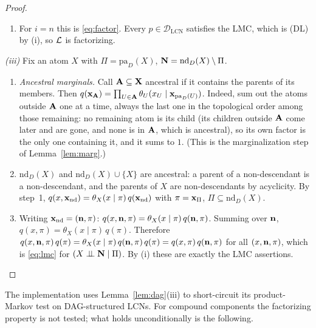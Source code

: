 \documentclass{article} %
\newcommand{\indep}{\perp\!\!\!\perp}
\newcommand{\DLCN}{\mathcal{D}_{\mathrm{LCN}}}
\newcommand{\pa}{\mathrm{pa}}
\begin{document}
\begin{proof}
\begin{enumerate}
  $p(x_1,\dots,x_i)=\theta_{X_i}(x_i\mid\pi)\,p(x_1,\dots,x_{i-1})$, and the
  induction hypothesis concludes.
  \item For $i=n$ this is \eqref{eq:factor}. Every $p\in\DLCN$ satisfies the LMC,
  which is (DL) by (i), so $\mathcal{L}$ is factorizing.
\end{enumerate}
\emph{(iii)} Fix an atom $X$ with $\Pi=\pa_D(X)$, $\mathbf{N}=\mathrm{nd}_D(X)\setminus\Pi$.
\begin{enumerate}
  \item \emph{Ancestral marginals.} Call $\mathbf{A}\subseteq\mathbf{X}$ ancestral if it contains
  the parents of its members. Then $q(\bx_{\bA})=\prod_{U\in\bA}\theta_U(x_U\mid\bx_{\pa_D(U)})$.
  Indeed, sum out the atoms outside $\mathbf{A}$ one at a time, always the last one in
  the topological order among those remaining: no remaining atom is its child
  (its children outside $\mathbf{A}$ come later and are gone, and none is in $\mathbf{A}$,
  which is ancestral), so its own factor is the only one containing it, and it
  sums to $1$. (This is the marginalization step of Lemma~\ref{lem:marg}.)
  \item $\mathrm{nd}_D(X)$ and $\mathrm{nd}_D(X)\cup\{X\}$ are ancestral: a parent of a
  non-descendant is a non-descendant, and the parents of $X$ are
  non-descendants by acyclicity. By step~1, $q(x,\mathbf{x}_{\mathrm{nd}})=\theta_X(x\mid\pi)\,q(\mathbf{x}_{\mathrm{nd}})$
  with $\pi=\mathbf{x}_\Pi$, $\Pi\subseteq\mathrm{nd}_D(X)$.
  \item Writing $\mathbf{x}_{\mathrm{nd}}=(\mathbf{n},\pi)$: $q(x,\mathbf{n},\pi)=\theta_X(x\mid\pi)\,q(\mathbf{n},\pi)$.
  Summing over $\mathbf{n}$, $q(x,\pi)=\theta_X(x\mid\pi)\,q(\pi)$. Therefore
  $q(x,\mathbf{n},\pi)\,q(\pi)=\theta_X(x\mid\pi)\,q(\mathbf{n},\pi)\,q(\pi)=q(x,\pi)\,q(\mathbf{n},\pi)$
  for all $(x,\mathbf{n},\pi)$, which is \eqref{eq:lmc} for $(X\indep\bN\mid\Pi)$.
  By (i) these are exactly the LMC assertions. \qedhere
\end{enumerate}
\end{proof}

The implementation uses Lemma~\ref{lem:dag}(iii) to short-circuit its
product-Markov test on DAG-structured LCNs. For compound components the
factorizing property is not tested; what holds unconditionally is the following.
\end{document}

